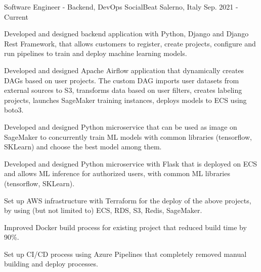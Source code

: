 

\begin{cventries}

  \cventry
    {Software Engineer - Backend, DevOps} %
    {SocialBeat} %
    {Salerno, Italy} %
    {Sep. 2021 - Current} %
    {
      \begin{cvitems} %
        \item {Developed and designed backend application with Python, Django and Django Rest Framework, that allows customers to register, create projects, configure and run pipelines to train and deploy machine learning models.}
        \item {Developed and designed Apache Airflow application that dynamically creates DAGs based on user projects. The custom DAG imports user datasets from external sources to S3, transforms data based on user filters, creates labeling projects, launches SageMaker training instances, deploys models to ECS using boto3.}
        \item {Developed and designed Python microservice that can be used as image on SageMaker to concurrently train ML models with common libraries (tensorflow, SKLearn) and choose the best model among them.}
        \item {Developed and designed Python microservice with Flask that is deployed on ECS and allows ML inference for authorized users, with common ML libraries (tensorflow, SKLearn).}
        \item {Set up AWS infrastructure with Terraform for the deploy of the above projects, by using (but not limited to) ECS, RDS, S3, Redis, SageMaker.}
        \item {Improved Docker build process for existing project that reduced build time by 90\%.}
        \item {Set up CI/CD process using Azure Pipelines that completely removed manual building and deploy processes.}
      \end{cvitems}
    }


\end{cventries}

